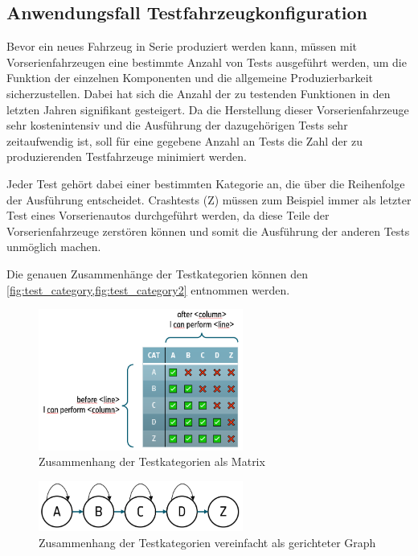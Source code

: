 \subsection{Anwendungsfall Testfahrzeugkonfiguration}\label{subsec:anwendungsfall-testfahrzeugkonfiguration}

Bevor ein neues Fahrzeug in Serie produziert werden kann,
müssen mit Vorserienfahrzeugen eine bestimmte Anzahl von Tests ausgeführt werden,
um die Funktion der einzelnen Komponenten und die allgemeine Produzierbarkeit sicherzustellen.
Dabei hat sich die Anzahl der zu testenden Funktionen in den letzten Jahren signifikant gesteigert.
Da die Herstellung dieser Vorserienfahrzeuge sehr kostenintensiv und die Ausführung der dazugehörigen
Tests sehr zeitaufwendig ist, soll für eine gegebene Anzahl an Tests die Zahl der zu produzierenden
Testfahrzeuge minimiert werden.

Jeder Test gehört dabei einer bestimmten Kategorie an,
die über die Reihenfolge der Ausführung entscheidet.
Crashtests (Z) müssen zum Beispiel immer als letzter Test eines
Vorserienautos durchgeführt werden, da diese Teile der
Vorserienfahrzeuge zerstören können und somit die
Ausführung der anderen Tests unmöglich machen.

Die genauen Zusammenhänge der Testkategorien können den
\cref{fig:test_category,fig:test_category2} entnommen werden.

\begin{figure}[H]
    \centering
    \includegraphics[width=0.6\textwidth]{images/testfahrzeug_problem/Bench-QC_TVC_simplified_Matrix}
    \caption{Zusammenhang der Testkategorien als Matrix}
    \label{fig:test_category}
\end{figure}
\begin{figure}[H]
    \centering
    \includegraphics[width=0.6\textwidth]{images/testfahrzeug_problem/Bench-QC_TVC_simplified_dependencies}
    \caption{Zusammenhang der Testkategorien vereinfacht als gerichteter Graph}
    \label{fig:test_category2}
\end{figure}

